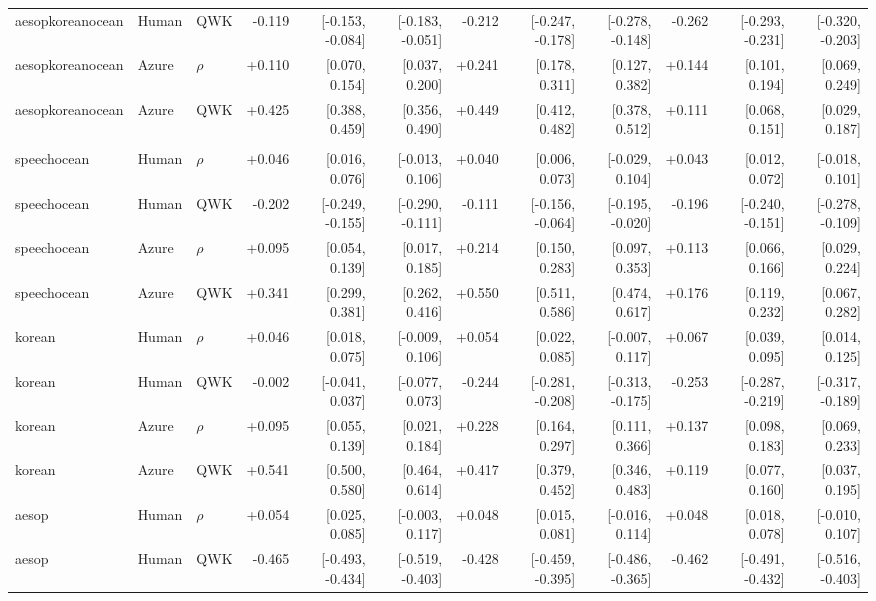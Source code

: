 \begin{landscape}
\begin{longtable}{@{}lllrrrrrrrrr@{}}
aesopkoreanocean & Human & QWK & -0.119 & [-0.153, -0.084] & [-0.183, -0.051] & -0.212 & [-0.247, -0.178] & [-0.278, -0.148] & -0.262 & [-0.293, -0.231] & [-0.320, -0.203]\\
aesopkoreanocean & Azure & $\rho$ & +0.110 & [0.070, 0.154] & [0.037, 0.200] & +0.241 & [0.178, 0.311] & [0.127, 0.382] & +0.144 & [0.101, 0.194] & [0.069, 0.249]\\
aesopkoreanocean & Azure & QWK & +0.425 & [0.388, 0.459] & [0.356, 0.490] & +0.449 & [0.412, 0.482] & [0.378, 0.512] & +0.111 & [0.068, 0.151] & [0.029, 0.187]\\
\addlinespace[2pt]
\midrule\multicolumn{12}{l}{\textbf{D: accuracy MAE}}\\*
speechocean & Human & $\rho$ & +0.046 & [0.016, 0.076] & [-0.013, 0.106] & +0.040 & [0.006, 0.073] & [-0.029, 0.104] & +0.043 & [0.012, 0.072] & [-0.018, 0.101]\\
speechocean & Human & QWK & -0.202 & [-0.249, -0.155] & [-0.290, -0.111] & -0.111 & [-0.156, -0.064] & [-0.195, -0.020] & -0.196 & [-0.240, -0.151] & [-0.278, -0.109]\\
speechocean & Azure & $\rho$ & +0.095 & [0.054, 0.139] & [0.017, 0.185] & +0.214 & [0.150, 0.283] & [0.097, 0.353] & +0.113 & [0.066, 0.166] & [0.029, 0.224]\\
speechocean & Azure & QWK & +0.341 & [0.299, 0.381] & [0.262, 0.416] & +0.550 & [0.511, 0.586] & [0.474, 0.617] & +0.176 & [0.119, 0.232] & [0.067, 0.282]\\
\addlinespace[2pt]
korean & Human & $\rho$ & +0.046 & [0.018, 0.075] & [-0.009, 0.106] & +0.054 & [0.022, 0.085] & [-0.007, 0.117] & +0.067 & [0.039, 0.095] & [0.014, 0.125]\\
korean & Human & QWK & -0.002 & [-0.041, 0.037] & [-0.077, 0.073] & -0.244 & [-0.281, -0.208] & [-0.313, -0.175] & -0.253 & [-0.287, -0.219] & [-0.317, -0.189]\\
korean & Azure & $\rho$ & +0.095 & [0.055, 0.139] & [0.021, 0.184] & +0.228 & [0.164, 0.297] & [0.111, 0.366] & +0.137 & [0.098, 0.183] & [0.069, 0.233]\\
korean & Azure & QWK & +0.541 & [0.500, 0.580] & [0.464, 0.614] & +0.417 & [0.379, 0.452] & [0.346, 0.483] & +0.119 & [0.077, 0.160] & [0.037, 0.195]\\
\addlinespace[2pt]
aesop & Human & $\rho$ & +0.054 & [0.025, 0.085] & [-0.003, 0.117] & +0.048 & [0.015, 0.081] & [-0.016, 0.114] & +0.048 & [0.018, 0.078] & [-0.010, 0.107]\\
aesop & Human & QWK & -0.465 & [-0.493, -0.434] & [-0.519, -0.403] & -0.428 & [-0.459, -0.395] & [-0.486, -0.365] & -0.462 & [-0.491, -0.432] & [-0.516, -0.403]\\

\end{longtable}
\end{landscape}
